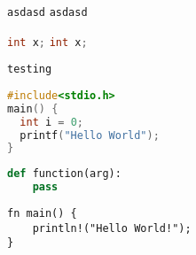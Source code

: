 \documentclass{article}
\begin{document}


\lstinline|asdasd|
\lstinline{asdasd}

\lstinline[language=C]|int x;|
\lstinline[language=C]{int x;}

\begin{lstlisting}
testing
\end{lstlisting}

\begin{lstlisting}[directivestyle={\color{black}},
                   language=C,
                   emph={int,char,double,float,unsigned},
                   emphstyle={\color{blue}}]
#include<stdio.h>
main() {
  int i = 0;
  printf("Hello World");
}
\end{lstlisting}

\begin{lstlisting}[language=python]
def function(arg):
    pass
\end{lstlisting}

\lstset{language=rust,numbers=none}
\begin{lstlisting}
fn main() {
    println!("Hello World!");
}
\end{lstlisting}

\lstset{language=x,numbers=none}

\end{document}
